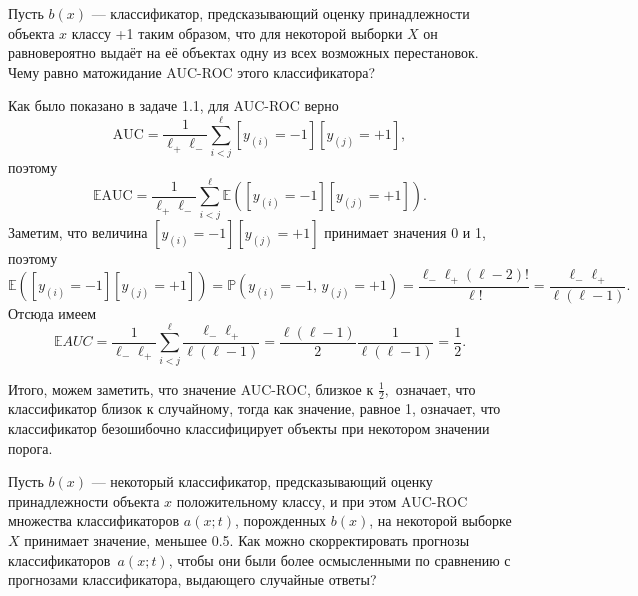 \documentclass[12pt,a4paper]{article}
\begin{document}
	\vspace{0.5cm}
	
	\begin{vkProblem}
		Пусть $b(x)$ — классификатор, предсказывающий оценку принадлежности объекта $x$ классу +1 таким образом, что для некоторой выборки $X$ он равновероятно выдаёт на её объектах одну из всех возможных перестановок. Чему равно матожидание AUC-ROC этого классификатора?
	\end{vkProblem}
	
	\begin{esSolution}
	Как было показано в задаче 1.1, для AUC-ROC верно
	$$\text{AUC} = \frac{1}{\ell_{+} \ell_{-}} \sum_{i < j}^{\ell} [y_{(i)} = -1] [y_{(j)} = +1],$$
	поэтому
	$$\mathbb{E}\text{AUC} = \frac{1}{\ell_{+} \ell_{-}} \sum_{i < j}^{\ell} \mathbb{E}([y_{(i)} = -1] [y_{(j)} = +1]).$$
	Заметим, что величина $[y_{(i)} = -1] [y_{(j)} = +1]$ принимает значения 0 и 1, поэтому $$\mathbb{E}([y_{(i)} = -1] [y_{(j)} = +1]) = \mathbb{P}(y_{(i)} = -1 , \, y_{(j)} = +1) = \frac{\ell_- \ell_+ (\ell-2)!}{\ell!} = \frac{\ell_- \ell_+}{\ell (\ell-1)}.$$
	Отсюда имеем
	$$\mathbb{E}AUC = \frac{1}{\ell_- \ell_+} \sum_{i<j}^\ell \frac{\ell_- \ell_+}{\ell (\ell-1)} = 
	\frac{\ell (\ell -1)}{2} \frac{1}{\ell (\ell-1)} = \frac{1}{2}.$$
	\end{esSolution}

Итого, можем заметить, что значение AUC-ROC, близкое к $\frac{1}{2},$ означает, что классификатор близок к случайному, тогда как значение, равное 1, означает, что классификатор безошибочно классифицирует объекты при некотором значении порога.

	\begin{vkProblem}
		Пусть $b(x)$ — некоторый классификатор, предсказывающий оценку принадлежности объекта $x$ положительному классу, и при этом AUC-ROC множества классификаторов $a(x;t)$, порожденных $b(x)$, на некоторой выборке $X$ принимает значение, меньшее 0.5.
		Как можно скорректировать прогнозы классификаторов~$a(x;t)$, чтобы они были более осмысленными по сравнению с прогнозами классификатора, выдающего случайные ответы?
	\end{vkProblem}
	
\end{document}
